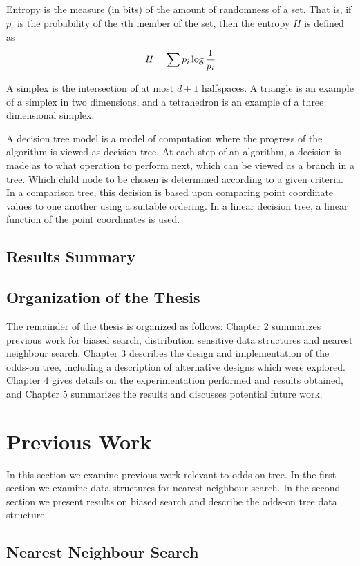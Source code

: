 \documentclass[mcs]{scsthesis}
\begin{document}
Entropy is the measure (in bits) of the amount of randomness of a set.  That is,
if \(p_i\) is the probability of the $i$th member of the set, then the entropy
\(H\) is defined as
$$
H = \sum{ p_i \log{1 \over p_i}}
$$

A simplex is the intersection of at most \(d + 1\) halfspaces. A triangle is an
example of a simplex in two dimensions, and a tetrahedron is an example of a
three dimensional simplex.

A decision tree model is a model of computation where the progress of the
algorithm is viewed as decision tree. At each step of an algorithm, a decision
is made as to what operation to perform next, which can be viewed as a branch
in a tree. Which child node to be chosen is determined according to a given
criteria. In a comparison tree, this decision is based upon comparing point
coordinate values to one another using a suitable ordering. In a linear decision
tree, a linear function of the point coordinates is used.

\section{Results Summary}


\section{Organization of the Thesis}

The remainder of the thesis is organized as follows: Chapter 2 summarizes
previous work for biased search, distribution sensitive data structures and
nearest neighbour search.  Chapter 3 describes the design and implementation of
the odds-on tree, including a description of alternative designs which were
explored.  Chapter 4 gives details on the experimentation performed and results
obtained, and Chapter 5 summarizes the results and discusses potential 
future work.

\chapter{Previous Work}

In this section we examine previous work relevant to odds-on tree. In the first
section we examine data structures for nearest-neighbour search. In the second
section we present results on biased search and describe the odds-on tree data
structure.

\section{Nearest Neighbour Search}
\end{document}
